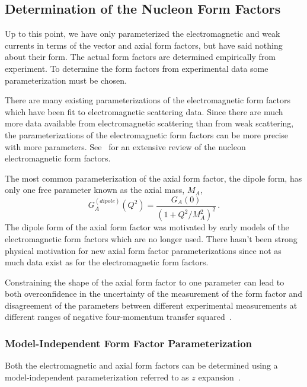 \subsection{Determination of the Nucleon Form Factors} \label{sec:formfactorforms}

  Up to this point, we have only parameterized the electromagnetic and weak
  currents in terms of the vector and axial form factors, but have said nothing
  about their form. The actual form factors are determined empirically from
  experiment. To determine the form factors from experimental data some
  parameterization must be chosen.

  There are many existing parameterizations of the electromagnetic form factors
  which have been fit to electromagnetic scattering data. Since there are much
  more data available from electromagnetic scattering than from weak
  scattering, the parameterizations of the electromagnetic form factors can be
  more precise with more parameters.  See~\cite{Perdrisat:2006hj} for an
  extensive review of the nucleon electromagnetic form factors.
  
  The most common parameterization of the axial form factor, the dipole form,
  has only one free parameter known as the axial mass, $M_A$,
  \begin{equation}
    G_A^{(dipole)}(Q^2) = \frac{G_A(0)}{(1+Q^2/M_A^2)^2} \,.
  \end{equation}
  The dipole form of the axial form factor was motivated by early models of the
  electromagnetic form factors which are no longer used. There hasn't been
  strong physical motivation for new axial form factor parameterizations since
  not as much data exist as for the electromagnetic form factors.

  Constraining the shape of the axial form factor to one parameter can lead to
  both overconfidence in the uncertainty of the measurement of the form factor
  and disagreement of the parameters between different experimental
  measurements at different ranges of negative four-momentum transfer
  squared~\cite{Bhattacharya:2011ah}.

  \subsubsection{Model-Independent Form Factor Parameterization}\label{sec:zexpansion}

  Both the electromagnetic and axial form factors can be determined using a
  model-independent parameterization referred to as $z$
  expansion~\cite{Boyd:1997qw}.


